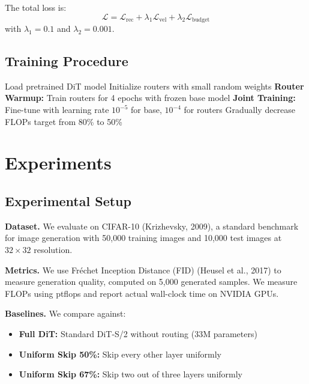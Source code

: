 \documentclass{article}
\begin{document}
The total loss is:
\begin{equation}
\mathcal{L} = \mathcal{L}_{\text{rec}} + \lambda_1 \mathcal{L}_{\text{vel}} + \lambda_2 \mathcal{L}_{\text{budget}}
\end{equation}
with $\lambda_1 = 0.1$ and $\lambda_2 = 0.001$.

\subsection{Training Procedure}

\begin{algorithm}[h]
\caption{FlowRouter Training}
\begin{algorithmic}[1]
\STATE Load pretrained DiT model
\STATE Initialize routers with small random weights
\STATE \textbf{Router Warmup:} Train routers for 4 epochs with frozen base model
\STATE \textbf{Joint Training:} Fine-tune with learning rate $10^{-5}$ for base, $10^{-4}$ for routers
\STATE Gradually decrease FLOPs target from 80\% to 50\%
\end{algorithmic}
\end{algorithm}

\section{Experiments}
\label{sec:experiments}

\subsection{Experimental Setup}

\textbf{Dataset.} We evaluate on CIFAR-10 (Krizhevsky, 2009), a standard benchmark for image generation with 50,000 training images and 10,000 test images at $32 \times 32$ resolution.

\textbf{Metrics.} We use Fr\'{e}chet Inception Distance (FID) (Heusel et al., 2017) to measure generation quality, computed on 5,000 generated samples. We measure FLOPs using ptflops and report actual wall-clock time on NVIDIA GPUs.

\textbf{Baselines.} We compare against:
\begin{itemize}
    \item \textbf{Full DiT:} Standard DiT-S/2 without routing (33M parameters)
    \item \textbf{Uniform Skip 50\%:} Skip every other layer uniformly
    \item \textbf{Uniform Skip 67\%:} Skip two out of three layers uniformly
\end{itemize}
\end{document}
